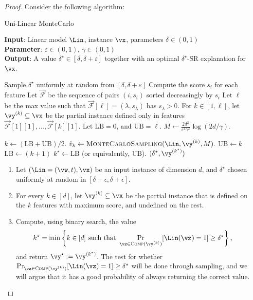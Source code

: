 \begin{proof}
Consider the following algorithm:

\renewcommand{\algorithmiccomment}[1]{\; \; \texttt{/* #1 */}}
\begin{algorithm}[tb]
	\caption{Uni-Linear MonteCarlo}
	\label{alg:algorithm}
	\textbf{Input}: Linear model $\Lin$, instance $\vx$, parameters $\delta \in (0, 1)$\\
	\textbf{Parameter}:  $\varepsilon \in (0, 1)$,  $\gamma \in (0, 1)$\\
	\textbf{Output}: A value $\delta^\star \in [\delta, \delta+\varepsilon]$ together with an optimal $\delta^\star$-SR explanation for $\vx$.
	\begin{algorithmic}[1] %
	\STATE Sample $\delta^\star$ uniformly at random from $[\delta, \delta + \varepsilon]$
	\STATE Compute the score $s_i$ for each feature
	\STATE Let $\vec{\mathcal{F}}$ be the sequence of pairs $(i, s_i)$ sorted decreasingly by $s_i$
	\STATE Let $\ell$ be the max value such that $\vec{\mathcal{F}}[\ell] = (\lambda, s_\lambda)$ has $s_\lambda > 0$.
	\STATE For $k \in [1, \ell]$, let $\vy^{(k)} \subseteq \vx$ be the partial instance defined only in features $\vec{\mathcal{F}}[1][1], \ldots, \vec{\mathcal{F}}[k][1]$.
	\STATE Let $\textrm{LB} = 0$, and $\textrm{UB} = \ell$.
	\STATE $M \gets \frac{2d^2}{\varepsilon^2 \gamma^2} \log(2d / \gamma)$.

		\STATE $k \gets \left(\textrm{LB} + \textrm{UB} \right)/2$.
		\STATE $\hat{v}_k \gets \textsc{MonteCarloSampling}(\Lin, \vy^{(k)}, M)$.
			\STATE $\textrm{UB} \gets k$
		\ELSE
			\STATE $\textrm{LB} \gets (k+1)$
		\ENDIF
	\ENDWHILE
	\STATE $k^\star \gets \textrm{LB}$ (or equivalently, $\textrm{UB}$).
	\STATE \RETURN $(\delta^\star, \vy^{(k^\star)})$
	\end{algorithmic}
	\end{algorithm}
\begin{enumerate}
	\item Let $(\Lin = (\vw, t), \vx)$ be an input instance of dimension $d$, and $\delta^\star$ chosen uniformly at random  in  $[\delta-\epsilon, \delta+\epsilon]$.
	\item For every $k \in [d]$, let $\vy^{(k)} \subseteq \vx$ be the partial instance that is defined on the $k$ features with maximum score, and undefined on the rest.
	\item Compute, using binary search, the value
	\[
		k^\star = \min \left\{ k \in [d] \text{ such that } \Pr_{\vz \in \textsc{Comp}(\vy^{(k)})}[\Lin(\vz) = 1] \geq \delta^\star \right\},
	\]
	and return $\vy^\star := \vy^{(k^\star)}$. The test for whether $\Pr_{\vz \in \textsc{Comp}(\vy^{(k)})}[\Lin(\vz) = 1] \geq \delta^\star$ will be done through sampling, and we will argue that it has a good probability of always returning the correct value.
\end{enumerate}


\end{proof}
